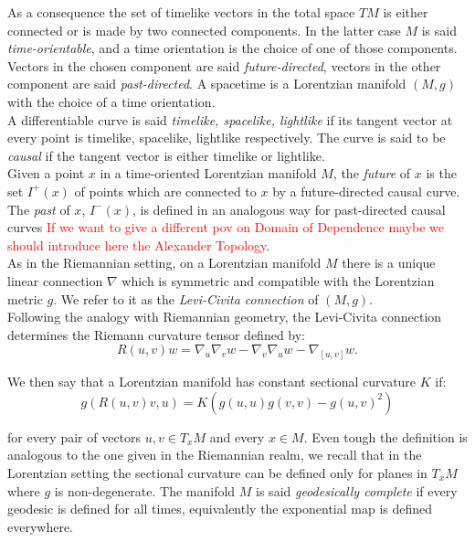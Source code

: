 \noindent As a consequence the set of timelike vectors in the total space $TM$ is either connected or is made by two connected components. In the latter case $M$ is said \textit{time-orientable}, and a time orientation is the choice of one of those components. Vectors in the chosen component are said \textit{future-directed}, vectors in the other component are said \textit{past-directed}. A spacetime is a Lorentzian manifold $(M,g)$ with the choice of a time orientation.\\
A differentiable curve is said \textit{timelike, spacelike, lightlike} if its tangent vector at every point is timelike, spacelike, lightlike respectively. The curve is said to be \textit{causal} if the tangent vector is either timelike or lightlike. \\ Given a point $x$ in a time-oriented Lorentzian manifold $M$, the \textit{future} of $x$ is the set $I^+(x)$ of points which are connected to $x$ by a future-directed causal curve. The \textit{past} of $x$, $I^-(x)$, is defined in an analogous way for past-directed causal curves \textcolor{red}{If we want to give a different pov on Domain of Dependence maybe we should introduce here the Alexander Topology}. \\As in the Riemannian setting, on a Lorentzian manifold $M$ there is a unique linear connection $\nabla$ which is symmetric and compatible with the Lorentzian metric $g$. We refer to it as the \textit{Levi-Civita connection} of $(M,g)$.\\ Following the analogy with Riemannian geometry, the Levi-Civita connection determines the Riemann curvature tensor defined by: 
\[
    R(u,v)w=\nabla_u\nabla_v w-\nabla_v\nabla_u w-\nabla_{[u,v]}w.
\]  

\noindent We then say that a Lorentzian manifold has constant sectional curvature $K$ if: 
\begin{equation}\label{sectionalcurvature}
    g(R(u,v)v,u)=K(g(u,u)g(v,v)-g(u,v)^2) 
\end{equation}
    


for every pair of vectors $u,v \in T_{x}M$ and every $x\in M$. Even tough the definition is analogous to the one given in the Riemannian realm, we recall that in the Lorentzian setting the sectional curvature can be defined only for planes in $T_{x}M$ where $g$ is non-degenerate. The manifold $M$ is said \textit{geodesically complete} if every geodesic is defined for all times, equivalently the exponential map is defined everywhere.\\

